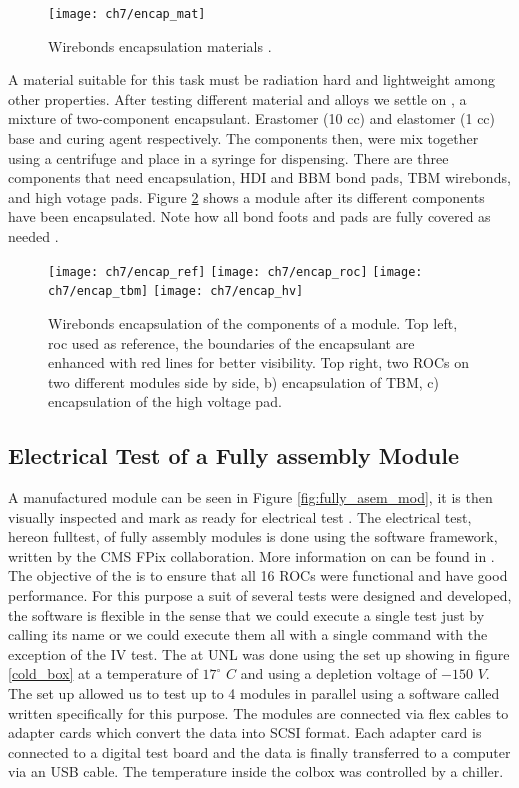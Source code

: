 \begin{figure}[!h]
	\centering
	\texttt{[image: ch7/encap\_mat]}
	\caption[Encapsulation materials]{Wirebonds encapsulation materials \cite{ph1_sop}.}
	\label{fig:encapmate}
\end{figure}

A material suitable for this task must be radiation hard and lightweight among other properties. After testing different material and alloys we settle on , a mixture of two-component encapsulant. Erastomer (10 cc) and elastomer (1 cc) base and curing agent respectively. The components then, were mix together using a centrifuge and place in a syringe for dispensing. There are three components that need encapsulation, HDI and BBM bond pads, TBM wirebonds, and high votage pads. Figure \ref{fig:encap} shows a module after its different components have been encapsulated. Note how all bond foots and pads are fully covered as needed \cite{and_the}. 

\begin{figure}[!h]
  \centering
  \texttt{[image: ch7/encap\_ref]}
  \texttt{[image: ch7/encap\_roc]}
  \texttt{[image: ch7/encap\_tbm]}
  \texttt{[image: ch7/encap\_hv]}
  \caption[Encapsulation results]{Wirebonds encapsulation of the components of a module. Top left, roc used as reference, the boundaries of the encapsulant are enhanced with red lines for better visibility. Top right, two ROCs on two different modules side by side, b) encapsulation of TBM, c) encapsulation of the high voltage pad.}\label{fig:encap}
\end{figure}

\subsection{Electrical Test of a Fully assembly Module}
A manufactured module can be seen in Figure \ref{fig:fully_asem_mod}, it is then visually inspected and mark as ready for electrical test {}. 
The electrical test, hereon fulltest, of fully assembly modules is done using the  software framework, written by the CMS FPix collaboration. More information on  can be found in \cite{pxar}. The objective of the  is to ensure that all 16 ROCs were functional and have good performance. For this purpose a suit of several tests were designed and developed, the software is flexible in the sense that we could execute a single test just by calling its name or we could execute them all with a single command  with the exception of the IV test. The  at UNL was done using the set up showing in figure \ref{cold_box} at a temperature of $17^{\circ}$ $C$ and using a depletion voltage of $-150$ $V$. The set up allowed us to test up to 4 modules in parallel using a software called  \cite{elcomandante} written specifically for this purpose. The modules are connected via flex cables to adapter cards which convert the data into SCSI format. Each adapter card is connected to a digital test board and the data is finally transferred to a computer via an USB cable. The temperature inside the colbox was controlled by a chiller.

